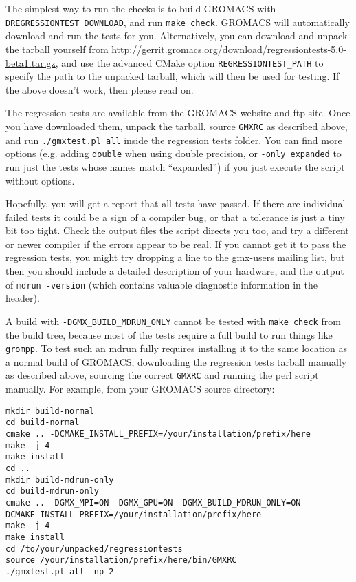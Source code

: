\documentclass{article}[12pt,a4paper,twoside]
\newcommand{\gromacs}{GROMACS}
\newcommand{\cmake}{CMake}
\begin{document}
The simplest way to run the checks is to build \gromacs{} with
\verb+-DREGRESSIONTEST_DOWNLOAD+, and run \verb+make check+.
\gromacs{} will automatically download and run the tests for you.
Alternatively, you can download and unpack the tarball yourself from
\url{http://gerrit.gromacs.org/download/regressiontests-5.0-beta1.tar.gz},
and use the advanced \cmake{} option \verb+REGRESSIONTEST_PATH+ to
specify the path to the unpacked tarball, which will then be used for
testing. If the above doesn't work, then please read on.

The regression tests are available from the \gromacs{} website and ftp
site.  Once you have downloaded them, unpack the tarball, source
\verb+GMXRC+ as described above, and run \verb+./gmxtest.pl all+
inside the regression tests folder. You can find more options
(e.g. adding \verb+double+ when using double precision, or
\verb+-only expanded+ to run just the tests whose names match
``expanded'') if you just execute the script without options.

Hopefully, you will get a report that all tests have passed. If there
are individual failed tests it could be a sign of a compiler bug, or
that a tolerance is just a tiny bit too tight. Check the output files
the script directs you too, and try a different or newer compiler if
the errors appear to be real. If you cannot get it to pass the
regression tests, you might try dropping a line to the gmx-users
mailing list, but then you should include a detailed description of
your hardware, and the output of \verb+mdrun -version+ (which contains
valuable diagnostic information in the header).

A build with \verb+-DGMX_BUILD_MDRUN_ONLY+ cannot be tested with
\verb+make check+ from the build tree, because most of the tests
require a full build to run things like \verb+grompp+. To test such an
mdrun fully requires installing it to the same location as a normal
build of \gromacs{}, downloading the regression tests tarball manually
as described above, sourcing the correct \verb+GMXRC+ and running the
perl script manually. For example, from your \gromacs{} source
directory:
\begin{verbatim}
mkdir build-normal
cd build-normal
cmake .. -DCMAKE_INSTALL_PREFIX=/your/installation/prefix/here
make -j 4
make install
cd ..
mkdir build-mdrun-only
cd build-mdrun-only
cmake .. -DGMX_MPI=ON -DGMX_GPU=ON -DGMX_BUILD_MDRUN_ONLY=ON -DCMAKE_INSTALL_PREFIX=/your/installation/prefix/here
make -j 4
make install
cd /to/your/unpacked/regressiontests
source /your/installation/prefix/here/bin/GMXRC
./gmxtest.pl all -np 2
\end{verbatim}
\end{document}
